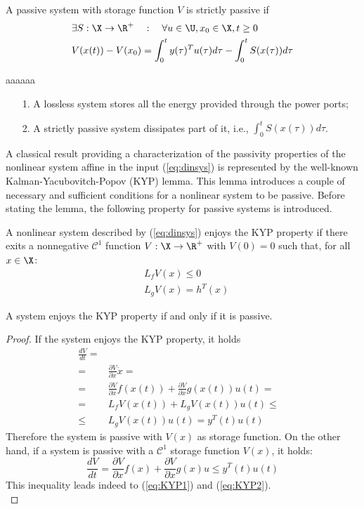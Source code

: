 %
\begin{defn}
	A passive system with storage function $V$ is strictly passive if
	\begin{align*}
	&\exists S:\X\rightarrow\R^+\quad:\quad\forall u\in\U, x_0\in\X, t\geq 0\nonumber\\
	&V(x(t))-V(x_0)=\int_{0}^{t}y(\tau)^Tu(\tau)d\tau-\int_{0}^{t}S(x(\tau))d\tau
	\end{align*}
\end{defn}
%
\begin{rem}{\color{white}aaaaaa}
	\begin{itemize}
		\item [1.] A lossless system stores all the energy provided through the power ports;
		\item [2.] A strictly passive system dissipates part of it, i.e., $\int_{0}^{t}S(x(\tau))d\tau$.
	\end{itemize}
\end{rem}
%
A classical result providing a characterization of the passivity properties of the nonlinear system affine in the input (\ref{eq:dinsys}) is represented by the well-known Kalman-Yacubovitch-Popov (KYP) lemma. This lemma introduces a couple of necessary and sufficient conditions for a nonlinear system to be passive. Before stating the lemma, the following property for passive systems is introduced.
%
\begin{defn}
	A nonlinear system described by (\ref{eq:dinsys}) enjoys the KYP property if there exits a nonnegative $\mathcal{C}^1$ function $V:\X\rightarrow\R^+$ with $V(0)=0$ such that, for all $x\in\X$:
	\begin{align}
	&L_fV(x)\leq 0\label{eq:KYP1}\\
	&L_gV(x)=h^T(x)\label{eq:KYP2}
	\end{align}
\end{defn}
%
\begin{prop}[Byrnes]
	A system enjoys the KYP property if and only if it is passive.
\end{prop}
%
\begin{proof}
	If the system enjoys the KYP property, it holds
	\begin{align*}
	\frac{dV}{dt}=&\\
	=&\frac{\partial V}{\partial x}\dot{x}=&\\
	=&\frac{\partial V}{\partial x}f(x(t))+\frac{\partial V}{\partial x}g(x(t))u(t)=&\\
	=&L_fV(x(t))+ L_gV(x(t))u(t)\leq&\\
	\leq&L_gV(x(t))u(t)=y^T(t)u(t)
	\end{align*}
	Therefore the system is passive with $V(x)$ as storage function.
	On the other hand, if a system is passive with a $\mathcal{C^1}$ storage function $V(x)$, it holds:
	\begin{equation*}
	\frac{dV}{dt}=\frac{\partial V}{\partial x}f(x)+\frac{\partial V}{\partial x}g(x)u\leq y^T(t)u(t)
	\end{equation*}
	This inequality leads indeed to (\ref{eq:KYP1}) and (\ref{eq:KYP2}).\\
\end{proof}
